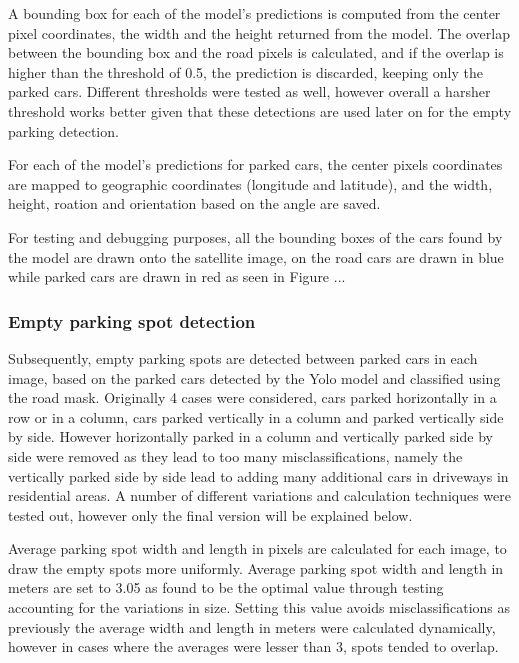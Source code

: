 A bounding box for each of the model's predictions is computed from the center pixel coordinates, the width and the height returned from the model.
The overlap between the bounding box and the road pixels is calculated, and if the overlap is higher than the threshold of 0.5, the prediction is discarded, keeping only the parked cars.
Different thresholds were tested as well, however overall a harsher threshold works better given that these detections are used later on for the empty parking detection.

For each of the model's predictions for parked cars, the center pixels coordinates are mapped to geographic coordinates (longitude and latitude), and the width, height, roation and orientation based on the angle are saved.

For testing and debugging purposes, all the bounding boxes of the cars found by the model are drawn onto the satellite image, on the road cars are drawn in blue while parked cars are drawn in red as seen in Figure ...

\subsubsection{Empty parking spot detection}
Subsequently, empty parking spots are detected between parked cars in each image, based on the parked cars detected by the Yolo model and classified using the road mask.
Originally 4 cases were considered, cars parked horizontally in a row or in a column, cars parked vertically in a column and parked vertically side by side. However horizontally parked in a column and vertically parked side by side were removed as they lead to too many misclassifications, namely the vertically parked side by side lead to adding many additional cars in driveways in residential areas.
A number of different variations and calculation techniques were tested out, however only the final version will be explained below.

Average parking spot width and length in pixels are calculated for each image, to draw the empty spots more uniformly. Average parking spot width and length in meters are set to 3.05 as found to be the optimal value through testing accounting for the variations in size.
Setting this value avoids misclassifications as previously the average width and length in meters were calculated dynamically, however in cases where the averages were lesser than 3, spots tended to overlap.

